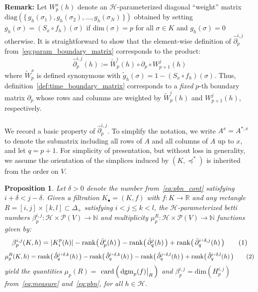 \documentclass[10pt]{article}
\numberwithin{equation}{section}
\newcommand{\+}{%
	\raisebox{0.18ex}{\scaleobj{0.55}{+}}
}
\newcommand\restr[2]{{%
  \left.\kern-\nulldelimiterspace %
  #1 %
  \vphantom{\big|} %
  \right|_{#2} %
  }}
\newtheorem{proposition}{Proposition}
\theoremstyle{definition}
\newcommand\numberthis{\addtocounter{equation}{1}\tag{\theequation}}
\begin{document}
\noindent
\textbf{Remark:} Let $W_p^x(h)$ denote an $\mathcal{H}$-parameterized diagonal ``weight'' matrix $\mathrm{diag}(\{\, g_h(\sigma_1), g_h(\sigma_2), \dots, g_h(\sigma_N) \, \})$ obtained by setting $g_h(\sigma) = (S_x \circ f_h)(\sigma)$ if $\mathrm{dim}(\sigma) = p$ for all $\sigma \in K$ and $g_h(\sigma) = 0$ otherwise. It is straightforward to show that the element-wise definition of $\hat{\partial}_p^{i,j}$ from~\eqref{eq:param_boundary_matrix} corresponds to the product: 
\begin{equation}
	\hat{\partial}_p^{i,j}(h) := \widetilde{W}_p^i(h) \circ \partial_p \circ W_{p+1}^j(h)
\end{equation}
where $\widetilde{W}_p^x$ is defined synonymous with $\tilde{g}_h(\sigma) = 1 - (S_x \circ f_h)(\sigma)$. Thus, definition~\ref{def:time_boundary_matrix} corresponds to a \emph{fixed} $p$-th boundary matrix $\partial_p$ whose rows and columns are weighted by $\widetilde{W}_p^i(h)$ and $W_{p+1}^j(h)$, respectively.
\\
\\
\noindent 
 We record a basic property of $\hat{\partial}_p^{i,j}$. To simplify the notation, we write $A^{x} = A^{\ast,x}$ to denote the submatrix including all rows of $A$ and all columns of $A$ up to $x$, and let $q = p + 1$. 
For simplicity of presentation, but without loss in generality, we assume the orientation of the simplices induced by $(K, \preceq^\ast)$ is inherited from the order on $V$. 
\begin{proposition}
	Let $\delta > 0$ denote the number from~\eqref{eq:pbn_cont} satisfying $i + \delta < j - \delta$. Given a filtration $K_\bullet = (K, f)$ with $f: K \to \mathbb{R}$ and any rectangle $R = [i,j] \times [k,l] \subset \Delta_{+}$ satisfying $i < j \leq k < l$, the $\mathcal{H}$-parameterized betti numbers $\beta_p^{i,j} : \mathcal{H} \times \mathcal{P}(V) \to \mathbb{N}$ and multiplicity $\mu_p^{R} : \mathcal{H} \times \mathcal{P}(V) \to \mathbb{N}$ functions given by: 
	\begin{align*}\label{eq:pbn_parameterized}
		\beta_p^{i,j}(K,h) = \lvert K_i^{p}(h) \rvert - \mathrm{rank}\big(\,\hat{\partial}_{p}^{i}(h)\,\big) - \mathrm{rank}\big(\,\hat{\partial}_{q}^{j}(h)\,\big) + \mathrm{rank}\big(\,\hat{\partial}_{q}^{i \+ \delta, j}(h)\,\big) \numberthis
	\end{align*}
	\begin{align*}\label{eq:mu_parameterized}
	\mu_p^{R}(K,h) = \mathrm{rank}\big(\,\hat{\partial}_{q}^{j \+ \delta, k}(h)\,\big) - \mathrm{rank}\big(\,\hat{\partial}_{q}^{i \+ \delta, k}(h)\,\big) - \mathrm{rank}\big(\,\hat{\partial}_{q}^{j \+ \delta, l}(h)\,\big) + \mathrm{rank}\big(\, \hat{\partial}_{q}^{i \+ \delta, l}(h)\,\big) \numberthis
	\end{align*}
	yield the quantities $\mu_p(R) = $
	$\mathrm{card} \left( \, \restr{\mathrm{dgm}_p(f)}{R} \, \right)$ and 
	$\beta_p^{i,j} = \mathrm{dim}(H_p^{i,j})$ from~\eqref{eq:measure} and~\eqref{eq:pbn}, for all $h \in \mathcal{H}$.
\end{proposition}
\end{document}
